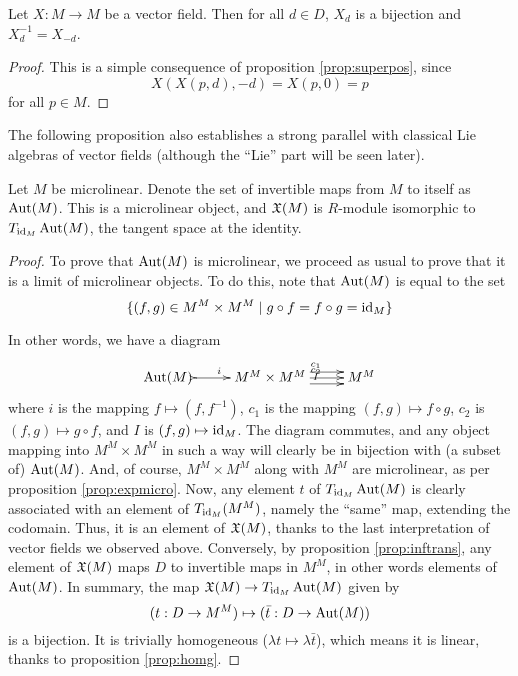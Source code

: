 \begin{proposition}
  Let \( X:M\to M \) be a vector field. Then for all \( d\in D \), \( X_d \) is a bijection and \( X_d^{-1}=X_{-d} \).
  \label{prop:inftrans}
\end{proposition}

\begin{proof}
  This is a simple consequence of proposition \ref{prop:superpos}, since
  \begin{equation*}
    X(X(p,d),-d)=X(p,0)=p
  \end{equation*}
  for all \( p\in M \).
\end{proof}

The following proposition also establishes a strong parallel with classical Lie algebras of vector fields (although the ``Lie'' part will be seen later).

\begin{proposition}
  Let \( M \) be microlinear. Denote the set of invertible maps from \( M \) to itself as \( \operatorname{Aut}(M) \). This is a microlinear object, and \( \mathfrak X(M) \) is \( R \)-module isomorphic to \( T_{\operatorname{id}_M}\operatorname{Aut}(M) \), the tangent space at the identity.
\end{proposition}

\begin{proof}
  To prove that \( \operatorname{Aut}(M) \) is microlinear, we proceed as usual to prove that it is a limit of microlinear objects. To do this, note that \( \operatorname{Aut}(M) \) is equal to the set
  \begin{equation*}
    \{ (f,g) \in M^M\times M^M \mid g\circ f = f \circ g = \operatorname{id}_M \}
  \end{equation*}

  In other words, we have a diagram
  \begin{equation*}
    \xymatrix{
      {\aut(M)} \ar@{>->}[r]^{i} & M^M\times M^M \ar@<1ex>[r]^{c_1} \ar[r]^{c_2}\ar@<-1ex>[r]^{I} & M^M
    }
  \end{equation*}
  where \( i \) is the mapping \( f\mapsto (f,f^{-1}) \), \( c_1 \) is the mapping \( (f,g)\mapsto f\circ g \), \( c_2 \) is \( (f,g)\mapsto g\circ f \), and \( I \) is \( (f,g)\mapsto \operatorname{id}_M \). The diagram commutes, and any object mapping into \( M^M\times M^M \) in such a way will clearly be in bijection with (a subset of) \( \operatorname{Aut}(M) \). And, of course, \( M^M\times M^M \) along with \( M^M \) are microlinear, as per proposition \ref{prop:expmicro}. Now, any element \( t \) of \( T_{\operatorname{id}_M}\operatorname{Aut}(M) \) is clearly associated with an element of \( T_{\operatorname{id}_M}(M^M) \), namely the ``same'' map, extending the codomain. Thus, it is an element of \( \mathfrak X(M) \), thanks to the last interpretation of vector fields we observed above. Conversely, by proposition \ref{prop:inftrans}, any element of \( \mathfrak X(M) \) maps \( D \) to invertible maps in \( M^M \), in other words elements of \( \operatorname{Aut}(M) \). In summary, the map \( \mathfrak X(M) \to T_{\operatorname{id}_M}\operatorname{Aut}(M) \) given by
  \begin{equation*}
    (t:D\to M^M) \mapsto (\bar t:D\to \operatorname{Aut}(M))
  \end{equation*}
  is a bijection. It is trivially homogeneous (\( \lambda t \mapsto \lambda \bar t \)), which means it is linear, thanks to proposition \ref{prop:homg}.
\end{proof}

